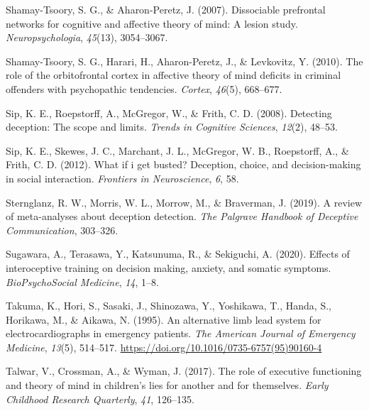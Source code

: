 \documentclass[
  man,mask,floatsintext]{apa6}
\newlength{\cslhangindent}
\newlength{\cslentryspacingunit} %
\newenvironment{CSLReferences}[2] %
 {%
  \setlength{\parindent}{0pt}
  \ifodd #1
  \let\oldpar\par
  \def\par{\hangindent=\cslhangindent\oldpar}
  \fi
  \setlength{\parskip}{#2\cslentryspacingunit}
 }%
 {}
\begin{document}
\begin{CSLReferences}{1}{0}
\leavevmode{}%
Shamay-Tsoory, S. G., \& Aharon-Peretz, J. (2007). Dissociable prefrontal networks for cognitive and affective theory of mind: A lesion study. \emph{Neuropsychologia}, \emph{45}(13), 3054--3067.

\leavevmode{}%
Shamay-Tsoory, S. G., Harari, H., Aharon-Peretz, J., \& Levkovitz, Y. (2010). The role of the orbitofrontal cortex in affective theory of mind deficits in criminal offenders with psychopathic tendencies. \emph{Cortex}, \emph{46}(5), 668--677.

\leavevmode{}%
Sip, K. E., Roepstorff, A., McGregor, W., \& Frith, C. D. (2008). Detecting deception: The scope and limits. \emph{Trends in Cognitive Sciences}, \emph{12}(2), 48--53.

\leavevmode{}%
Sip, K. E., Skewes, J. C., Marchant, J. L., McGregor, W. B., Roepstorff, A., \& Frith, C. D. (2012). What if i get busted? Deception, choice, and decision-making in social interaction. \emph{Frontiers in Neuroscience}, \emph{6}, 58.

\leavevmode{}%
Sternglanz, R. W., Morris, W. L., Morrow, M., \& Braverman, J. (2019). A review of meta-analyses about deception detection. \emph{The Palgrave Handbook of Deceptive Communication}, 303--326.

\leavevmode{}%
Sugawara, A., Terasawa, Y., Katsunuma, R., \& Sekiguchi, A. (2020). Effects of interoceptive training on decision making, anxiety, and somatic symptoms. \emph{BioPsychoSocial Medicine}, \emph{14}, 1--8.

\leavevmode{}%
Takuma, K., Hori, S., Sasaki, J., Shinozawa, Y., Yoshikawa, T., Handa, S., Horikawa, M., \& Aikawa, N. (1995). An alternative limb lead system for electrocardiographs in emergency patients. \emph{The American Journal of Emergency Medicine}, \emph{13}(5), 514--517. \url{https://doi.org/10.1016/0735-6757(95)90160-4}

\leavevmode{}%
Talwar, V., Crossman, A., \& Wyman, J. (2017). The role of executive functioning and theory of mind in children's lies for another and for themselves. \emph{Early Childhood Research Quarterly}, \emph{41}, 126--135.


\end{CSLReferences}
\end{document}
